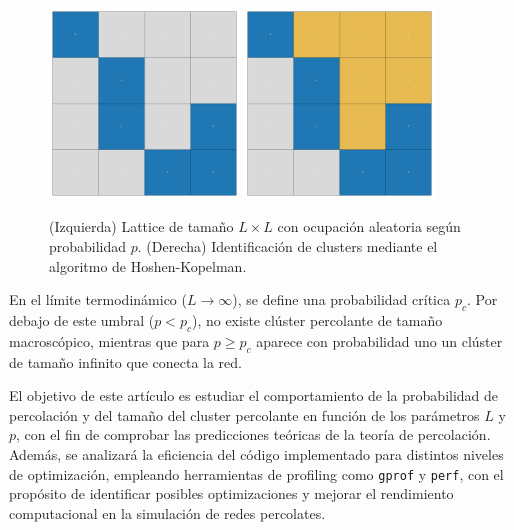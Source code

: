 \documentclass{article}
\begin{document}
\begin{figure}[h]
    \centering
    \includegraphics[width=0.45\textwidth]{figures/lattice.pdf}
    \hfill
    \includegraphics[width=0.45\textwidth]{figures/clusters.pdf}
    \caption{(Izquierda) Lattice de tamaño \( L \times L \) con ocupación aleatoria según probabilidad \( p \). (Derecha) Identificación de clusters mediante el algoritmo de Hoshen-Kopelman.}
    \label{fig:lattice_clusters}
\end{figure}
En el límite termodinámico (\(L \to \infty\)), se define una probabilidad crítica \(p_{c}\). Por debajo de este umbral (\(p < p_{c}\)), no existe clúster percolante de tamaño macroscópico, mientras que para \(p \ge p_{c}\) aparece con probabilidad uno un clúster de tamaño infinito que conecta la red.

El objetivo de este artículo es estudiar el comportamiento de la probabilidad de percolación y del tamaño del cluster percolante en función de los parámetros \(L\) y \(p\), con el fin de comprobar las predicciones teóricas de la teoría de percolación. Además, se analizará la eficiencia del código implementado para distintos niveles de optimización, empleando herramientas de profiling como \texttt{gprof} y \texttt{perf}, con el propósito de identificar posibles optimizaciones y mejorar el rendimiento computacional en la simulación de redes percolates.
\end{document}
